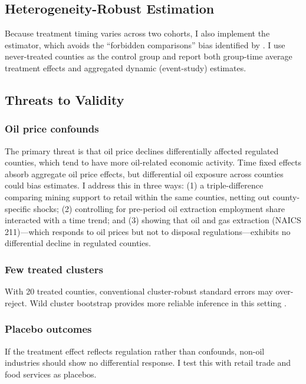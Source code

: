 \documentclass[12pt]{article}
\begin{document}
\subsection{Heterogeneity-Robust Estimation}

Because treatment timing varies across two cohorts, I also implement the \citet{callawaysantanna2021} estimator, which avoids the ``forbidden comparisons'' bias identified by \citet{goodmanbacon2021}. I use never-treated counties as the control group and report both group-time average treatment effects and aggregated dynamic (event-study) estimates.

\subsection{Threats to Validity}

\subsubsection*{Oil price confounds} The primary threat is that oil price declines differentially affected regulated counties, which tend to have more oil-related economic activity. Time fixed effects absorb aggregate oil price effects, but differential oil exposure across counties could bias estimates. I address this in three ways: (1) a triple-difference comparing mining support to retail within the same counties, netting out county-specific shocks; (2) controlling for pre-period oil extraction employment share interacted with a time trend; and (3) showing that oil and gas extraction (NAICS 211)---which responds to oil prices but not to disposal regulations---exhibits no differential decline in regulated counties.

\subsubsection*{Few treated clusters} With 20 treated counties, conventional cluster-robust standard errors may over-reject. Wild cluster bootstrap provides more reliable inference in this setting \citep{cameron2008}.

\subsubsection*{Placebo outcomes} If the treatment effect reflects regulation rather than confounds, non-oil industries should show no differential response. I test this with retail trade and food services as placebos.
\end{document}
